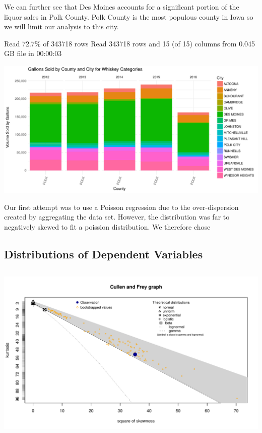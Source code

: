 \documentclass[]{elsarticle} %
\makeatletter
\def\maxwidth{\ifdim\Gin@nat@width>\linewidth\linewidth
\else\Gin@nat@width\fi}
\let\Oldincludegraphics\includegraphics
\renewcommand{\includegraphics}[1]{\Oldincludegraphics[width=\maxwidth]{#1}}
\makeatother
\begin{document}
We can further see that Des Moines accounts for a significant portion of
the liquor sales in Polk County. Polk County is the most populous county
in Iowa so we will limit our analysis to this city.

Read 72.7\% of 343718 rows Read 343718 rows and 15 (of 15) columns from
0.045 GB file in 00:00:03

\includegraphics{Final_Project_files/figure-latex/unnamed-chunk-9-1.pdf}

Our first attempt was to use a Poisson regression due to the
over-dispersion created by aggregating the data set. However, the
distribution was far to negatively skewed to fit a poission
distribution. We therefore chose

\subsection{Distributions of Dependent
Variables}\label{distributions-of-dependent-variables}

\subsection{\texorpdfstring{\protect\includegraphics{Final_Project_files/figure-latex/unnamed-chunk-10-1.pdf}}{}}\label{section}
\end{document}

